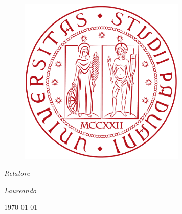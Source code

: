 
\frontmatter %
\pagestyle{plain} %



\begin{titlepage}
	\begin{center}
		
		\vspace{4cm}
		{\scshape\LARGE \univname}\\\vspace{0.7cm} %
		\textsc{\Large \deptname}\\[0.5cm] %
		\textsc{\large \facname}
		
		\vspace{2cm}
		\begin{figure}[H]
			\begin{center}
				\includegraphics[height=8cm]{Immagini/logo}
			\end{center}
		\end{figure}
		\vspace{2cm}
		
		
		{\huge \bfseries \ttitle} %
		
		\vspace{2cm}
		
		\begin{minipage}[t]{0.49\textwidth}
			\begin{flushleft} \large
				\emph{Relatore} \\
				\supname %
			\end{flushleft}
		\end{minipage}
%
		\begin{minipage}[t]{0.49\textwidth}
			\vspace{1cm}
			\begin{flushright} \large
				\emph{Laureando}\\
				\authorname %
			\end{flushright}
		\end{minipage}
	
		\vspace{1cm}
		{\large \today}\\[4cm] %
		
	\end{center}
\end{titlepage}